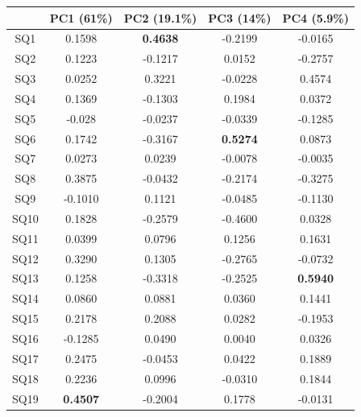\begin{table}[H]
\centering
\begin{tabular}{c|c|c|c|c}
    & PC1 (61\%)      & PC2 (19.1\%)    & PC3 (14\%)      & PC4 (5.9\%)     \\ \hline
SQ1  & 0.1598          & \textbf{0.4638} & -0.2199         & -0.0165         \\ \hline
SQ2  & 0.1223          & -0.1217         & 0.0152          & -0.2757         \\ \hline
SQ3  & 0.0252          & 0.3221          & -0.0228         & 0.4574          \\ \hline
SQ4  & 0.1369          & -0.1303         & 0.1984          & 0.0372          \\ \hline
SQ5  & -0.028          & -0.0237         & -0.0339         & -0.1285         \\ \hline
SQ6  & 0.1742          & -0.3167         & \textbf{0.5274} & 0.0873          \\ \hline
SQ7  & 0.0273          & 0.0239          & -0.0078         & -0.0035         \\ \hline
SQ8  & 0.3875          & -0.0432         & -0.2174         & -0.3275         \\ \hline
SQ9  & -0.1010         & 0.1121          & -0.0485         & -0.1130          \\ \hline
SQ10 & 0.1828          & -0.2579         & -0.4600         & 0.0328          \\ \hline
SQ11 & 0.0399          & 0.0796          & 0.1256          & 0.1631          \\ \hline
SQ12 & 0.3290          & 0.1305          & -0.2765         & -0.0732         \\ \hline
SQ13 & 0.1258          & -0.3318         & -0.2525         & \textbf{0.5940} \\ \hline
SQ14 & 0.0860          & 0.0881          & 0.0360          & 0.1441          \\ \hline
SQ15 & 0.2178          & 0.2088          & 0.0282          & -0.1953         \\ \hline
SQ16 & -0.1285         & 0.0490          & 0.0040          & 0.0326          \\ \hline
SQ17 & 0.2475          & -0.0453         & 0.0422          & 0.1889          \\ \hline
SQ18 & 0.2236          & 0.0996          & -0.0310         & 0.1844          \\ \hline
SQ19 & \textbf{0.4507} & -0.2004         & 0.1778          & -0.0131         \\ \hline

\end{tabular}
\end{table}
